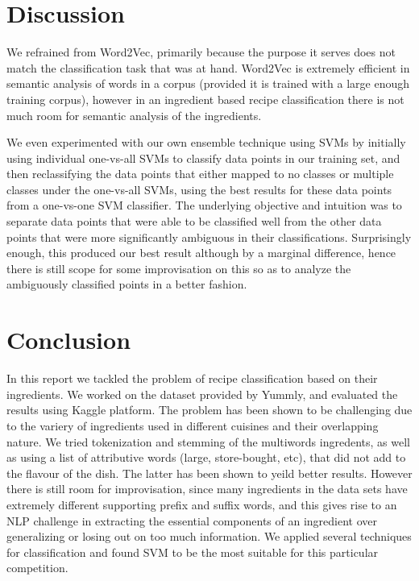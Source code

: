 \documentclass[prodmode,acmtap]{acmlarge}
\begin{document}
\section{Discussion}
We refrained from Word2Vec, primarily because the purpose it serves does not match the classification task that was at hand. Word2Vec is extremely efficient in semantic analysis of words in a corpus (provided it is trained with a large enough training corpus), however in an ingredient based recipe classification there is not much room for semantic analysis of the ingredients.

We even experimented with our own ensemble technique using SVM\textquotesingle s by initially using individual one-vs-all SVM\textquotesingle s to classify data points in our training set, and then reclassifying the data points that either mapped to no classes or multiple classes under the one-vs-all SVM\textquotesingle s, using the best results for these data points from a one-vs-one SVM classifier. The underlying objective and intuition was to separate data points that were able to be classified well from the other data points that were more significantly ambiguous in their classifications. Surprisingly enough, this produced our best result although by a marginal difference, hence there is still scope for some improvisation on this so as to analyze the ambiguously classified points in a better fashion.


\section{Conclusion}
In this report we tackled the problem of recipe classification based on their ingredients. We worked on the dataset provided by Yummly, and evaluated the results using Kaggle platform. The problem has been shown to be challenging due to the variery of ingredients used in different cuisines and their overlapping nature. We tried tokenization and stemming of the multiwords ingredents, as well as using a list of attributive words (large, store-bought, etc), that did not add to the flavour of the dish. The latter has been shown to yeild better results. However there is still room for improvisation, since many ingredients in the data sets have extremely different supporting prefix and suffix words, and this gives rise to an NLP challenge in extracting the essential components of an ingredient over generalizing or losing out on too much information. We applied several techniques for classification and found SVM to be the most suitable for this particular competition.
\end{document}
